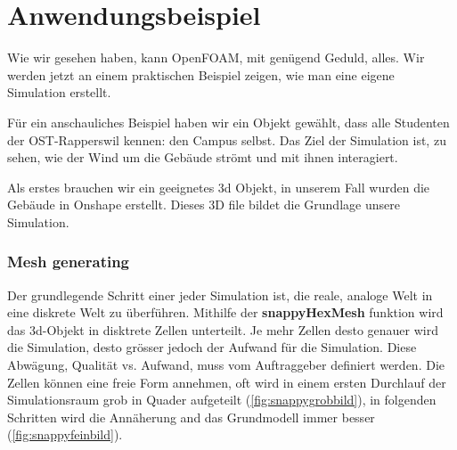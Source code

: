 %
%
%
%
\section{Anwendungsbeispiel
\label{openfoam:section:Anwendungsbeispiel}}
Wie wir gesehen haben, kann OpenFOAM, mit genügend Geduld, alles. 
Wir werden jetzt an einem praktischen Beispiel zeigen, wie man eine eigene Simulation erstellt.

Für ein anschauliches Beispiel haben wir ein Objekt gewählt, dass alle Studenten der OST-Rapperswil kennen: den Campus selbst.
Das Ziel der Simulation ist, zu sehen, wie der Wind um die Gebäude strömt und mit ihnen interagiert.

Als erstes brauchen wir ein geeignetes 3d Objekt, in unserem Fall wurden die Gebäude in Onshape erstellt.
Dieses 3D file bildet die Grundlage unsere Simulation.

\subsubsection{Mesh generating\label{openfoam:section:Mesh generating}}
Der grundlegende Schritt einer jeder Simulation ist, die reale, analoge Welt in eine diskrete Welt zu überführen.
Mithilfe der \textbf{snappyHexMesh} funktion wird das 3d-Objekt in disktrete Zellen unterteilt. Je mehr Zellen desto genauer
wird die Simulation, desto grösser jedoch der Aufwand für die Simulation. Diese Abwägung, Qualität vs. Aufwand, muss vom Auftraggeber definiert werden.
Die Zellen können eine freie Form annehmen, oft wird in einem ersten Durchlauf der Simulationsraum grob in Quader aufgeteilt (\ref{fig:snappygrobbild}),
in folgenden Schritten wird die Annäherung and das Grundmodell immer besser (\ref{fig:snappyfeinbild}).



